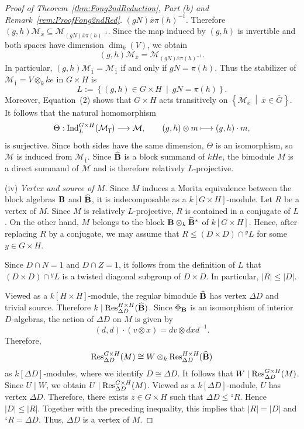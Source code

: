 \begin{proof}[Proof of Theorem~\ref{thm:Fong2ndReduction}, Part {\rm(b)} and
Remark~\ref{rem:ProofFong2ndRed}]{\leavevmode}
$(gN)\overline x\pi(h)^{-1}$. Therefore $(g,h)\mathcal M_{\overline x} \subseteq \mathcal M_{(gN)\overline x\pi(h)^{-1}}$.
Since the map induced by $(g,h)$ is invertible and both spaces have dimension $\dim_k(V)$, we obtain
\[
(g,h)\mathcal M_{\overline x}=\mathcal M_{(gN)\overline x\pi(h)^{-1}}.
\tag{2}
\]
In particular, $(g,h)\mathcal M_{\overline1}=\mathcal M_{\overline1}$ if and only if $gN=\pi(h)$. Thus the stabilizer of $\mathcal M_{\overline1}=V\otimes_k ke$ in $G\times H$ is
\[
L:=\left\{(g,h)\in G\times H\ \middle|\ gN=\pi(h) \right\}.
\]
Moreover, Equation~{\rm(2)} shows that $G\times H$ acts transitively on $\left\{\mathcal M_{\overline x}\ \middle|\ \overline x\in\overline G\right\}$. It follows that the natural homomorphism
\[
\Theta:\operatorname{Ind}_L^{G\times H}(\mathcal M_{\overline1})\longrightarrow\mathcal M,\qquad(g,h)\otimes m\longmapsto(g,h)\cdot m,
\]
is surjective. Since both sides have the same dimension, $\Theta$ is an isomorphism, so $\mathcal M$ is induced from $\mathcal M_{\overline1}$. Since $\widehat{{\mathbf{B}}}$ is a block summand of $kHe$, the bimodule $M$ is a direct summand of $\mathcal M$ and is therefore
relatively $L$-projective.

\smallskip
\noindent
{\rm(iv)} \emph{Vertex and source of $M$.}
Since $M$ induces a Morita equivalence between the block algebras ${\mathbf{B}}$ and $\widehat{{\mathbf{B}}}$, it is indecomposable as a $k[G\times H]$-module. Let $R$ be a vertex of $M$. Since $M$ is relatively $L$-projective, $R$ is contained in a conjugate of $L$. On the other hand, $M$ belongs to the block ${\mathbf{B}}\otimes_k\widehat{{\mathbf{B}}}^*$ of $k[G\times H]$. Hence, after replacing $R$ by a conjugate, we may assume that $R\leq (D\times D)\cap{}^yL$ for some $y\in G\times H$.

Since $D\cap N=1$ and $D\cap Z=1$, it follows from the definition of $L$ that $(D\times D)\cap{}^yL$ is a twisted diagonal
subgroup of $D\times D$.
In particular, $|R|\leq |D|$.

Viewed as a $k[H\times H]$-module, the regular bimodule $\widehat{{\mathbf{B}}}$ has vertex $\Delta D$ and trivial source. Therefore $k\mid
\operatorname{Res}_{\Delta D}^{H\times H}(\widehat{{\mathbf{B}}})$. Since $\Phi_{{\mathbf{B}}}$ is an isomorphism of interior
$D$-algebras, the action of $\Delta D$ on $M$ is given by
\[
(d,d)\cdot(v\otimes x) =dv\otimes dxd^{-1}.
\]
Therefore,
\[
\operatorname{Res}_{\Delta D}^{G\times H}(M)\cong W\otimes_k
\operatorname{Res}_{\Delta D}^{H\times H}(\widehat{{\mathbf{B}}})
\]
as $k[\Delta D]$-modules, where we identify
$D\cong\Delta D$. 
It follows that $W\mid\operatorname{Res}_{\Delta D}^{G\times H}(M)$. Since $U\mid W$, we obtain $U\mid \operatorname{Res}_{\Delta D}^{G\times H}(M)$.
Viewed as a $k[\Delta D]$-module, $U$ has vertex
$\Delta D$. Therefore, there exists $z\in G\times H$ such that $\Delta D\leq{}^zR$.
Hence $|D|\leq |R|$. Together with the preceding inequality, this implies that $|R|=|D|$ and ${}^zR=\Delta D$. Thus, $\Delta D$ is a vertex of $M$.


\end{proof}
